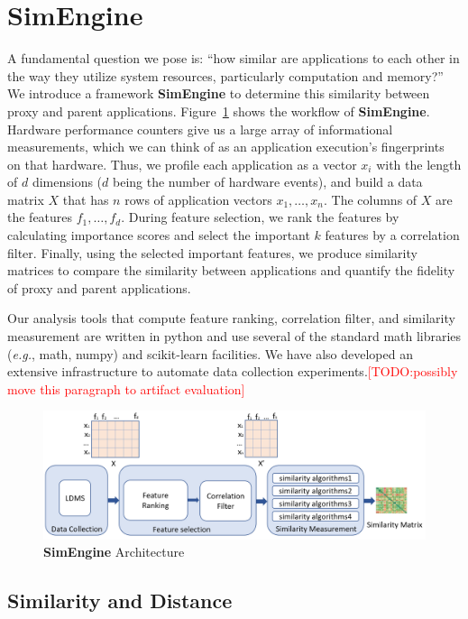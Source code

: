 \documentclass[conference]{IEEEtran}
\newcommand{\us}{\textbf{SimEngine}\xspace}
\newcommand{\eg}                {\emph{e.g.},\xspace}
\newcommand{\todo}[1]           {\textcolor{red}{[TODO:#1]}}
\begin{document}
\section{\us}
A fundamental question we pose is: ``how similar are applications to each other in the way they utilize system resources, particularly computation and memory?''
We introduce a framework \us to determine this similarity between proxy and parent applications. Figure~\ref{figs:us} shows the workflow of \us. Hardware performance counters give us a large array of informational measurements, which we can think of as an application execution’s fingerprints on that hardware. Thus, we profile each application as a vector $x_{i}$ with the length of $d$ dimensions ($d$ being the number of hardware events), and build a data matrix $X$ that has $n$ rows of application vectors $x_{1},\ldots,x_{n}$. The columns of $X$ are the features $f_{1},\ldots,f_{d}$. During feature selection, we rank the features by calculating importance scores and select the important $k$ features by a correlation filter. Finally, using the selected important features, we produce similarity matrices to compare the similarity between applications and quantify the fidelity of proxy and parent applications. 

Our analysis tools that compute feature ranking, correlation filter, and similarity measurement are written in python and use several of the standard math libraries (\eg math, numpy) and scikit-learn facilities.  We have also 
developed an extensive infrastructure to automate data collection experiments.\todo{possibly move this paragraph to artifact evaluation}

\begin{figure}[ht]
\centering
\includegraphics[width=\linewidth]{figs/SimEngine.png}
\caption{\us Architecture}
\label{figs:us}
\end{figure}

\subsection{Similarity and Distance}
\label{sec:Sim}
\end{document}
